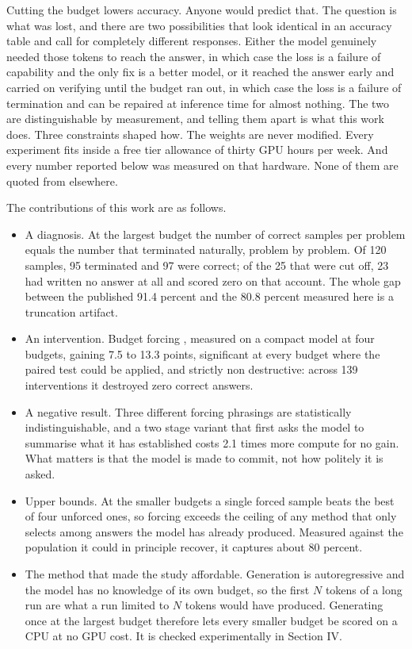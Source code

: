 \documentclass[conference]{IEEEtran}
\begin{document}
Cutting the budget lowers accuracy. Anyone would predict that. The question is
what was lost, and there are two possibilities that look identical in an accuracy
table and call for completely different responses. Either the model genuinely
needed those tokens to reach the answer, in which case the loss is a failure of
capability and the only fix is a better model, or it reached the answer early and
carried on verifying until the budget ran out, in which case the loss is a
failure of termination and can be repaired at inference time for almost nothing.
The two are distinguishable by measurement, and telling them apart is what this
work does. Three constraints shaped how. The weights are never modified. Every
experiment fits inside a free tier allowance of thirty GPU hours per week. And
every number reported below was measured on that hardware. None of them are
quoted from elsewhere.

The contributions of this work are as follows.

\begin{itemize}

\item A diagnosis. At the largest budget the number of correct samples per
problem equals the number that terminated naturally, problem by problem. Of 120
samples, 95 terminated and 97 were correct; of the 25 that were cut off, 23 had
written no answer at all and scored zero on that account. The whole gap between the published 91.4 percent and the 80.8 percent
measured here is a truncation artifact.

\item An intervention. Budget forcing \cite{s1}, measured on a compact model at
four budgets, gaining 7.5 to 13.3 points, significant at every budget where the
paired test could be applied, and strictly non destructive: across 139
interventions it destroyed zero correct answers.

\item A negative result. Three different forcing phrasings are statistically
indistinguishable, and a two stage variant that first asks the model to summarise
what it has established costs 2.1 times more compute for no gain. What matters is
that the model is made to commit, not how politely it is asked.

\item Upper bounds. At the smaller budgets a single forced sample beats the best
of four unforced ones, so forcing exceeds the ceiling of any method that only
selects among answers the model has already produced. Measured against the
population it could in principle recover, it captures about 80 percent.

\item The method that made the study affordable. Generation is autoregressive and
the model has no knowledge of its own budget, so the first $N$ tokens of a long
run are what a run limited to $N$ tokens would have produced. Generating once at
the largest budget therefore lets every smaller budget be scored on a CPU at no
GPU cost. It is checked experimentally in Section IV.

\end{itemize}
\end{document}
